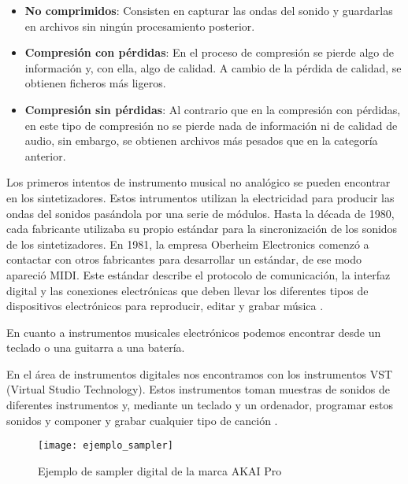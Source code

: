         \begin{itemize}
            \item \textbf{No comprimidos}: Consisten en capturar las ondas del sonido y guardarlas en archivos sin
            ningún procesamiento posterior.
            \item \textbf{Compresión con pérdidas}: En el proceso de compresión se pierde algo de información y, con
            ella, algo de calidad. A cambio de la pérdida de calidad, se obtienen ficheros más ligeros.
            \item \textbf{Compresión sin pérdidas}: Al contrario que en la compresión con pérdidas, en este tipo de
            compresión no se pierde nada de información ni de calidad de audio, sin embargo, se obtienen archivos más
            pesados que en la categoría anterior.
        \end{itemize}

        Los primeros intentos de instrumento musical no analógico se pueden encontrar en los sintetizadores. Estos
        intrumentos utilizan la electricidad para producir las ondas del sonidos pasándola por una serie de módulos.
        Hasta la década de 1980, cada fabricante utilizaba su propio estándar para la sincronización de los sonidos de
        los sintetizadores. En 1981, la empresa Oberheim Electronics comenzó a contactar con otros fabricantes para
        desarrollar un estándar, de ese modo apareció MIDI. Este estándar describe el protocolo de comunicación, la
        interfaz digital y las conexiones electrónicas que deben llevar los diferentes tipos de dispositivos
        electrónicos para reproducir, editar y grabar música \cite{midi_wikipedia}.

        En cuanto a instrumentos musicales electrónicos podemos encontrar desde un teclado o una guitarra a una batería.

        En el área de instrumentos digitales nos encontramos con los instrumentos VST (Virtual Studio Technology). Estos
        instrumentos toman muestras de sonidos de diferentes instrumentos y, mediante un teclado y un ordenador,
        programar estos sonidos y componer y grabar cualquier tipo de canción \cite{historia_instrumentos_digitales}.

        \begin{figure}[ht]
            \centering
            \texttt{[image: ejemplo\_sampler]}
            \caption{Ejemplo de sampler digital de la marca AKAI Pro \cite{akai_pro_imagen}\label{fig:EjemploSampler}}
        \end{figure}

